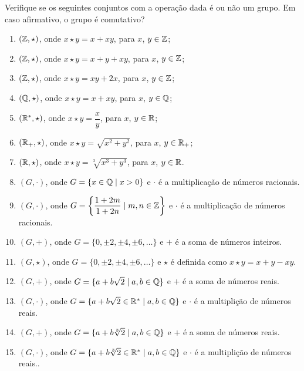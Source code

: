 \documentclass[12pt]{exam}
\begin{document}
    \questao{} Verifique se os seguintes conjuntos com a opera\c{c}\~ao dada \'e ou n\~ao um grupo. Em caso afirmativo, o grupo \'e comutativo?
    \begin{enumerate}[label=({\alph*})]
        \item $(\mathbb{Z}, \star)$, onde $x \star y = x + xy$, para $x$, $y \in \mathbb{Z}$;

        \item $(\mathbb{Z}, \star)$, onde $x \star y = x + y + xy$, para $x$, $y \in \mathbb{Z}$;

        \item $(\mathbb{Z}, \star)$, onde $x \star y = xy + 2x$, para $x$, $y \in \mathbb{Z}$;

        \item $(\mathbb{Q}, \star)$, onde $x \star y = x + xy$, para $x$, $y \in \mathbb{Q}$;

        \item $(\mathbb{R}^*, \star)$, onde $x \star y = \dfrac{x}{y}$, para $x$, $y \in \mathbb{R}$;

        \item $(\mathbb{R}_+, \star)$, onde $x \star y = \sqrt{x^2 + y^2}$, para $x$, $y \in \mathbb{R}_+$;

        \item $(\mathbb{R}, \star)$, onde $x \star y = \sqrt[3]{x^3 + y^3}$, para $x$, $y \in \mathbb{R}$.

        \item $(G, \cdot)$, onde $G = \{x \in \mathbb{Q} \mid x > 0\}$ e $\cdot$ \'e a multiplica\c{c}\~ao de n\'umeros racionais.

        \item $(G, \cdot)$, onde $G = \left\{\dfrac{1 + 2m}{1 + 2n} \mid m, n \in \mathbb{Z}\right\}$ e $\cdot$ \'e a multiplica\c{c}\~ao de n\'umeros racionais.

        \item $(G, +)$, onde $G = \{0, \pm 2, \pm 4, \pm 6, \dots\}$ e $+$ \'e a soma de n\'umeros inteiros.

        \item $(G, \star)$, onde $G = \{0, \pm 2, \pm 4, \pm 6, \dots\}$ e $\star$ \'e definida como $x \star y = x + y - xy$.

        \item $(G, +)$, onde $G = \{a + b\sqrt{2} \mid a, b \in \mathbb{Q}\}$ e $+$ \'e a soma de n\'umeros reais.

        \item $(G, \cdot)$, onde $G = \{a + b\sqrt{2} \in \mathbb{R}^* \mid a, b \in \mathbb{Q}\}$ e $\cdot$ \'e a multipli\c{c}\~ao de n\'umeros reais.

        \item $(G, +)$, onde $G = \{a + b\sqrt[3]{2} \mid a, b \in \mathbb{Q}\}$ e $+$ \'e a soma de n\'umeros reais.

        \item $(G, \cdot)$, onde $G = \{a + b\sqrt[3]{2} \in \mathbb{R}^* \mid a, b \in \mathbb{Q}\}$ e $\cdot$ \'e a multipli\c{c}\~ao de n\'umeros reais..
    \end{enumerate}
\end{document}
